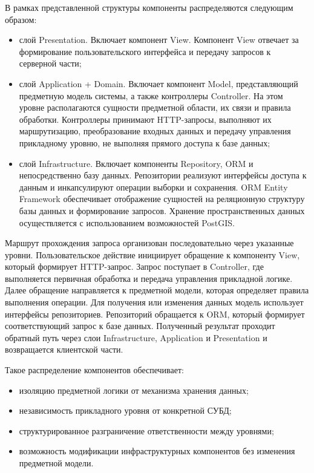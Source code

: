 В рамках представленной структуры компоненты распределяются следующим образом:
\begin{itemize}
\item слой Presentation. Включает компонент View. Компонент View отвечает за формирование пользовательского интерфейса и передачу запросов к серверной части;
\item слой Application + Domain. Включает компонент Model, представляющий предметную модель системы, а также контроллеры Controller. На этом уровне располагаются сущности предметной области, их связи и правила обработки. Контроллеры принимают HTTP-запросы, выполняют их маршрутизацию, преобразование входных данных и передачу управления прикладному уровню, не выполняя прямого доступа к базе данных;
\item слой Infrastructure. Включает компоненты Repository, ORM и непосредственно базу данных. Репозитории реализуют интерфейсы доступа к данным и инкапсулируют операции выборки и сохранения. ORM Entity Framework обеспечивает отображение сущностей на реляционную структуру базы данных и формирование запросов. Хранение пространственных данных осуществляется с использованием возможностей PostGIS.
\end{itemize}

Маршрут прохождения запроса организован последовательно через указанные уровни. Пользовательское действие инициирует обращение к компоненту View, который формирует HTTP-запрос. Запрос поступает в Controller, где выполняется первичная обработка и передача управления прикладной логике. Далее обращение направляется к предметной модели, которая определяет правила выполнения операции. Для получения или изменения данных модель использует интерфейсы репозиториев. Репозиторий обращается к ORM, который формирует соответствующий запрос к базе данных. Полученный результат проходит обратный путь через слои Infrastructure, Application и Presentation и возвращается клиентской части.

Такое распределение компонентов обеспечивает:
\begin{itemize}
\item изоляцию предметной логики от механизма хранения данных;
\item независимость прикладного уровня от конкретной СУБД;
\item структурированное разграничение ответственности между уровнями;
\item возможность модификации инфраструктурных компонентов без изменения предметной модели.
\end{itemize}


